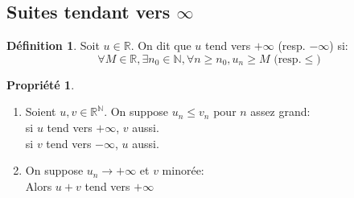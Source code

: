 \documentclass[fleqn]{article}
\theoremstyle{definition} \newtheorem*{defi}{D\'efinition}
\theoremstyle{definition} \newtheorem*{theo}{Th\'eor\`eme}
\theoremstyle{definition} \newtheorem*{prop}{Propri\'et\'e}
\theoremstyle{definition} \newtheorem*{coro}{Corollaire}
\theoremstyle{remark} \newtheorem*{rqs}{Remarque}
\begin{document}
\subsection{Suites tendant vers $\infty$}
\begin{defi}
	Soit $u \in \mathbb{R}$. On dit que $u$ tend vers $+\infty$ (resp. $-\infty$) si:
	\[\forall M \in \mathbb{R}, \exists n_0 \in \mathbb{N}, \forall n \geq n_0, u_n \geq M \text{ (resp.} \leq)\]
\end{defi}
\begin{prop} $ $
	\begin{enumerate}
		\item Soient $u, v \in \mathbb{R}^\mathbb{N}$. On suppose $u_n \leq v_n$ pour $n$ assez grand: \\
			si $u$ tend vers $+\infty$, $v$ aussi. \\
			si $v$ tend vers $-\infty$, $u$ aussi.
		\item On suppose $u_n \rightarrow +\infty$ et $v$ minor\'ee: \\
			Alors $u+v$ tend vers $+\infty$
	\end{enumerate}
\end{prop}
\end{document}
